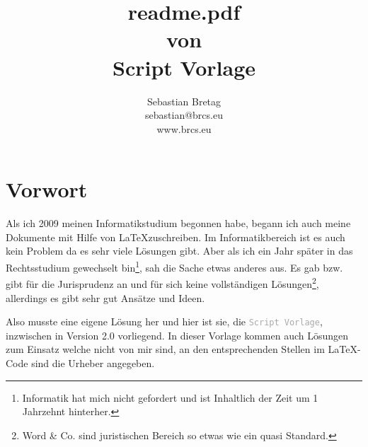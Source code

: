 \documentclass[oneside,headings=small,headsepline,12pt,a4paper,numbers=noenddot,chapterprefix=false,parskip=full-]{scrreprt}
\newcommand{\cmd}[1]{\textcolor{darkgrey}{{\small\texttt{{#1}}}}}
\begin{document}
\begingroup


\title{readme.pdf\\ von\\ Script Vorlage}

\author{Sebastian Bretag\\sebastian@brcs.eu\\www.brcs.eu}

\begin{titlepage}

\makeatletter
\noindent\@author\hfill\@date
\makeatother

\vspace{3cm}

\begin{center}

{%
\bfseries\hrulefill

\makeatletter
\Huge\@title
\makeatother


\hrulefill}

\end{center}
\end{titlepage}


\chapter*{Vorwort}

Als ich 2009 meinen Informatikstudium begonnen habe, begann ich auch meine Dokumente mit Hilfe von \LaTeX zuschreiben. Im Informatikbereich ist es auch kein Problem da es sehr viele Lösungen gibt. Aber als ich ein Jahr später in das Rechtsstudium gewechselt bin\footnote{Informatik hat mich nicht gefordert und ist Inhaltlich der Zeit um 1 Jahrzehnt hinterher.}, sah die Sache etwas anderes aus. Es gab bzw. gibt für die Jurisprudenz an und für sich keine vollständigen Lösungen\footnote{Word \& Co. sind juristischen Bereich so etwas wie ein quasi Standard.}, allerdings es gibt sehr gut Ansätze und Ideen.

Also musste eine eigene Lösung her und hier ist sie, die \cmd{Script Vorlage}, inzwischen in Version 2.0 vorliegend. In dieser Vorlage kommen auch Lösungen zum Einsatz welche nicht von mir sind, an den entsprechenden Stellen im \LaTeX-Code sind die Urheber angegeben.
\end{document}

